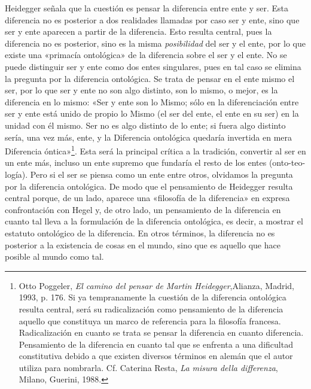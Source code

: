 Heidegger señala que la cuestión es pensar la diferencia entre ente y ser. Esta diferencia no es posterior a dos realidades llamadas por caso ser y ente, sino que ser y ente aparecen a partir de la diferencia. Esto resulta central, pues la diferencia no es posterior, sino es la misma \emph{posibilidad} del ser y el ente, por lo que existe una «primacía ontológica» de la diferencia sobre el ser y el ente. No se puede distinguir ser y ente como dos entes singulares, pues en tal caso se elimina la pregunta por la diferencia ontológica. Se trata de pensar en el ente mismo el ser, por lo que ser y ente no son algo distinto, son lo mismo, o mejor, es la diferencia en lo mismo: «Ser y ente son lo Mismo; sólo en la diferenciación entre ser y ente está unido de propio lo Mismo (el ser del ente, el ente en su ser) en la unidad con él mismo. Ser no es algo distinto de lo ente; si fuera algo distinto sería, una vez más, ente, y la Diferencia ontológica quedaría invertida en mera Diferencia óntica»\footnote{Otto Poggeler, \emph{El camino del pensar de Martin Heidegger},Alianza, Madrid, 1993, p. 176. Si ya tempranamente la cuestión de la diferencia ontológica resulta central, será su radicalización como pensamiento de la diferencia aquello que constituya un marco de referencia para la filosofía francesa. Radicalización en cuanto se trata se pensar la diferencia en cuanto diferencia. Pensamiento de la diferencia en cuanto tal que se enfrenta a una dificultad constitutiva debido a que existen diversos términos en alemán que el autor utiliza para nombrarla. Cf. Caterina Resta, \emph{La misura della differenza}, Milano, Guerini, 1988.}. Esta será la principal crítica a la tradición, convertir al ser en un ente más, incluso un ente supremo que fundaría el resto de los entes (onto-teo-logía). Pero si el ser se piensa como un ente entre otros, olvidamos la pregunta por la diferencia ontológica. De modo que el pensamiento de Heidegger resulta central porque, de un lado, aparece una «filosofía de la diferencia» en expresa confrontación con Hegel y, de otro lado, un pensamiento de la diferencia en cuanto tal lleva a la formulación de la diferencia ontológica, es decir, a mostrar el estatuto ontológico de la diferencia. En otros términos, la diferencia no es posterior a la existencia de cosas en el mundo, sino que es aquello que hace posible al mundo como tal.

